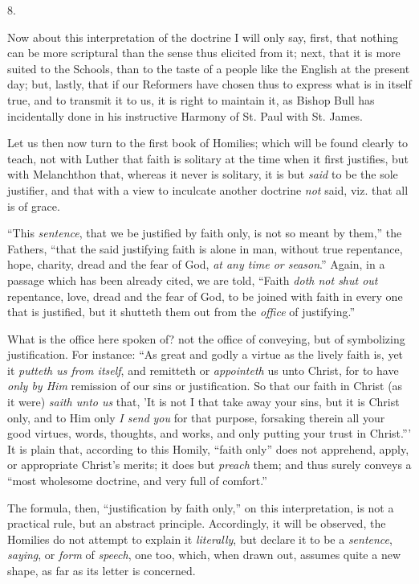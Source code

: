 8.

Now about this interpretation of the doctrine I will only say,
first, that nothing can be more scriptural than the sense thus
elicited from it; next, that it is more suited to the Schools, than to
the taste of a people like the English at the present day; but,
lastly, that if our Reformers have chosen thus to express what is in
itself true, and to transmit it to us, it is right to maintain it, as
Bishop Bull has incidentally done in his instructive Harmony of St.
Paul with St. James.

Let us then now turn to the first book of Homilies; which will be
found clearly to teach, not with Luther that faith is solitary at the
time when it first justifies, but with Melanchthon that, whereas it
never is solitary, it is but \emph{said} to be the sole justifier, and
that with a view to inculcate another doctrine \emph{not} said, viz.
that all is of grace.

``This \emph{sentence}, that we be justified by faith only, is
not so meant by them,'' the Fathers, ``that the said
justifying faith is alone in man, without true repentance, hope,
charity, dread and the fear of God, \emph{at any time or season}.''
Again, in a passage which has been already cited, we are told,
``Faith \emph{doth not shut out} repentance, love, dread and the
fear of God, to be joined with faith in every one that is justified,
but it shutteth them out from the \emph{office} of justifying.''

What is the office here spoken of? not the office of conveying, but
of symbolizing justification. For instance: ``As great and godly a
virtue as the lively faith is, yet it \emph{putteth us from itself},
and remitteth or \emph{appointeth} us unto Christ, for to have \emph{only
by Him} remission of our sins or justification. So that our faith
in Christ (as it were) \emph{saith unto us} that, 'It is not I that
take away your sins, but it is Christ only, and to Him only \emph{I send}
\emph{you} for that purpose, forsaking therein all your good
virtues, words, thoughts, and works, and only putting your trust in
Christ.''' It is plain that, according to this Homily, ``faith
only'' does not apprehend, apply, or appropriate Christ's merits;
it does but \emph{preach} them; and thus surely conveys a ``most
wholesome doctrine, and very full of comfort.''

The formula, then, ``justification by faith only,'' on this
interpretation, is not a practical rule, but an abstract principle.
Accordingly, it will be observed, the Homilies do not attempt to
explain it \emph{literally}, but declare it to be a \emph{sentence}, \emph{saying},
or \emph{form} of \emph{speech}, one too, which, when drawn out,
assumes quite a new shape, as far as its letter is concerned.

